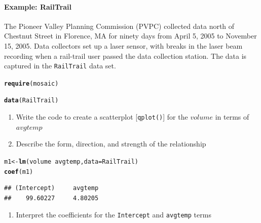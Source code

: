 \documentclass[10pt]{article}\usepackage[]{graphicx}\usepackage[]{color}
\makeatletter
\newcommand{\hlopt}[1]{\textcolor[rgb]{0,0,0}{#1}}%
\newcommand{\hlstd}[1]{\textcolor[rgb]{0.345,0.345,0.345}{#1}}%
\newcommand{\hlkwb}[1]{\textcolor[rgb]{0.69,0.353,0.396}{#1}}%
\newcommand{\hlkwc}[1]{\textcolor[rgb]{0.333,0.667,0.333}{#1}}%
\newcommand{\hlkwd}[1]{\textcolor[rgb]{0.737,0.353,0.396}{\textbf{#1}}}%
\newenvironment{kframe}{%
 \def\at@end@of@kframe{}%
 \ifinner\ifhmode%
  \def\at@end@of@kframe{\end{minipage}}%
  \begin{minipage}{\columnwidth}%
 \fi\fi%
 \def\FrameCommand##1{\hskip\@totalleftmargin \hskip-\fboxsep
 \colorbox{shadecolor}{##1}\hskip-\fboxsep
     \hskip-\linewidth \hskip-\@totalleftmargin \hskip\columnwidth}%
 \MakeFramed {\advance\hsize-\width
   \@totalleftmargin\z@ \linewidth\hsize
   \@setminipage}}%
 {\par\unskip\endMakeFramed%
 \at@end@of@kframe}
\newenvironment{knitrout}{}{} %
\newcommand{\cmd}[1]{\texttt{#1}}
\makeatother
\begin{document}
\paragraph{Example: RailTrail}

The Pioneer Valley Planning Commission (PVPC) collected data north of Chestnut Street in Florence, MA for ninety days from April 5, 2005 to November 15, 2005. Data collectors set up a laser sensor, with breaks in the laser beam recording when a rail-trail user passed the data collection station. The data is captured in the \cmd{RailTrail} data set.

\begin{knitrout}
\color{fgcolor}\begin{kframe}
\begin{alltt}
\hlkwd{require}\hlstd{(mosaic)}
\end{alltt}


{\ttfamily\noindent\color{warningcolor}{\#\# Warning: Installed Rcpp (0.12.12) different from Rcpp used to build dplyr (0.12.10).\\\#\# Please reinstall dplyr to avoid random crashes or undefined behavior.}}\begin{alltt}
\hlkwd{data}\hlstd{(RailTrail)}
\end{alltt}
\end{kframe}
\end{knitrout}
\clearpage
\begin{enumerate}
  \itemsep0.6in
  \item Write the code to create a scatterplot [\cmd{qplot()}] for the $volume$ in terms of $avgtemp$
  \item Describe the form, direction, and strength of the relationship
  \vspace{0.6in}
\end{enumerate}

\begin{knitrout}\footnotesize
{}\color{fgcolor}\begin{kframe}
\begin{alltt}
\hlstd{m1} \hlkwb{<-} \hlkwd{lm}\hlstd{(volume}\hlopt{~}\hlstd{avgtemp,} \hlkwc{data}\hlstd{=RailTrail)}
\hlkwd{coef}\hlstd{(m1)}
\end{alltt}
\begin{verbatim}
## (Intercept)     avgtemp 
##    99.60227     4.80205
\end{verbatim}
\end{kframe}
\end{knitrout}
\begin{enumerate}
  \itemsep0.6in
  \item Interpret the coefficients for the \cmd{Intercept} and \cmd{avgtemp} terms
  \vspace{1in}
\end{enumerate}
\end{document}
